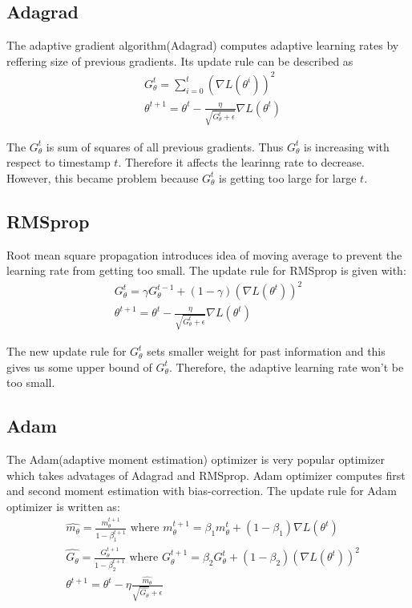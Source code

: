 \documentclass[11pt]{article}
\begin{document}
	\subsection{\cite{duchi2011adaptive} Adagrad}
	The adaptive gradient algorithm(Adagrad) computes adaptive learning rates by reffering size of previous gradients. Its update rule can be described as
	\begin{equation*}
		\begin{aligned}
			&G_\theta^t=\sum_{i=0}^t(\nabla L(\theta^i))^2\\
			&\theta^{t+1}=\theta^t-\frac{\eta}{\sqrt{G_\theta^t+\epsilon}}\nabla L(\theta^t)
		\end{aligned} 
	\end{equation*}

	The $G_\theta^t$ is sum of squares of all previous gradients. Thus $G_\theta^t$ is increasing with respect to timestamp $t$. Therefore it affects the learinng rate to decrease. However, this became problem because $G_\theta^t$ is getting too large for large $t$.

	\subsection{\cite{hinton2012neural} RMSprop}
	Root mean square propagation introduces idea of moving average to prevent the learning rate from getting too small. 
	The update rule for RMSprop is given with:
	\begin{equation*}
		\begin{aligned}
			G_\theta^t=\gamma G_\theta^{t-1}+(1-\gamma)(\nabla L(\theta^t))^2\\
			\theta^{t+1}=\theta^t-\frac{\eta}{\sqrt{G_\theta^t+\epsilon}}\nabla L(\theta^t)
		\end{aligned}
	\end{equation*}

	The new update rule for $G_\theta^t$ sets smaller weight for past information and this gives us some upper bound of $G_\theta^t$. Therefore, the adaptive learning rate won't be too small.

	\subsection{\cite{kingma2014adam} Adam}
	The Adam(adaptive moment estimation) optimizer is very popular optimizer which takes advatages of Adagrad and RMSprop. Adam optimizer computes first and second moment estimation with bias-correction. The update rule for Adam optimizer is written as:
	\begin{equation*}
		\begin{aligned}
			&\hat{m_\theta}=\frac{m_\theta^{t+1}}{1-\beta_1^{t+1}}\mbox{ where } m_\theta^{t+1}=\beta_1 m_\theta^t+(1-\beta_1)\nabla L(\theta^t)\\
			&\hat{G_\theta}=\frac{G_\theta^{t+1}}{1-\beta_2^{t+1}}\mbox{ where } G_\theta^{t+1}=\beta_2 G_\theta^t+(1-\beta_2)(\nabla L(\theta^t))^2\\
			&\theta^{t+1}=\theta^t-\eta\frac{\hat{m_\theta}}{\sqrt{\hat{G_\theta}}+\epsilon}
		\end{aligned}
	\end{equation*}
\end{document}
